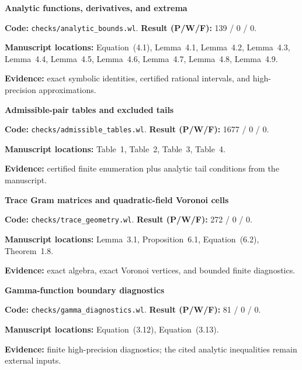 {\small
\noindent\textbf{Analytic functions, derivatives, and extrema}\par
\textbf{Code:} \nolinkurl{checks/analytic_bounds.wl}. \textbf{Result (P/W/F):} 139 / 0 / 0.\par
\textbf{Manuscript locations:} Equation~(4.1), Lemma~4.1, Lemma~4.2, Lemma~4.3, Lemma~4.4, Lemma~4.5, Lemma~4.6, Lemma~4.7, Lemma~4.8, Lemma~4.9.\par
\textbf{Evidence:} exact symbolic identities, certified rational intervals, and high-precision approximations.\par
\medskip
\noindent\textbf{Admissible-pair tables and excluded tails}\par
\textbf{Code:} \nolinkurl{checks/admissible_tables.wl}. \textbf{Result (P/W/F):} 1677 / 0 / 0.\par
\textbf{Manuscript locations:} Table~1, Table~2, Table~3, Table~4.\par
\textbf{Evidence:} certified finite enumeration plus analytic tail conditions from the manuscript.\par
\medskip
\noindent\textbf{Trace Gram matrices and quadratic-field Voronoi cells}\par
\textbf{Code:} \nolinkurl{checks/trace_geometry.wl}. \textbf{Result (P/W/F):} 272 / 0 / 0.\par
\textbf{Manuscript locations:} Lemma~3.1, Proposition~6.1, Equation~(6.2), Theorem~1.8.\par
\textbf{Evidence:} exact algebra, exact Voronoi vertices, and bounded finite diagnostics.\par
\medskip
\noindent\textbf{Gamma-function boundary diagnostics}\par
\textbf{Code:} \nolinkurl{checks/gamma_diagnostics.wl}. \textbf{Result (P/W/F):} 81 / 0 / 0.\par
\textbf{Manuscript locations:} Equation~(3.12), Equation~(3.13).\par
\textbf{Evidence:} finite high-precision diagnostics; the cited analytic inequalities remain external inputs.\par
}
